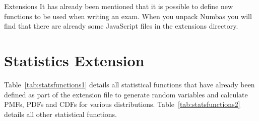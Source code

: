 %
%
%

\begin{chapter}{\label{cha:extensions}Extensions}
  It has already been mentioned that it is possible to define new functions to 
  be used when writing an exam. When you unpack Numbas you will find that there
  are already some JavaScript files in the extensions directory. 
  
  \section{\label{sec:stats}Statistics Extension}
  Table~\ref{tab:statsfunctions1} details all statistical functions that have 
  already been defined as part of the  extension file to generate random variables
  and calculate PMFs, PDFs and CDFs for various distributions. Table~\ref{tab:statsfunctions2} details 
  all other statistical functions. 
  

\end{chapter}
